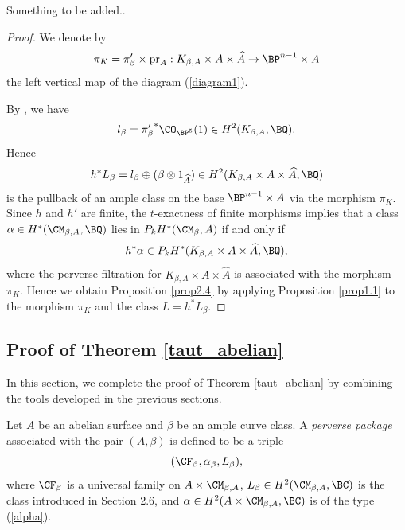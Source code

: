 Something to be added..









\begin{proof}
We denote by
\[
\pi_K = \pi'_\beta \times \mathrm{pr}_A : K_{\beta, A} \times A \times \widehat{A} \to \BP^{n-1}\times A
\]
the left vertical map of the diagram (\ref{diagram1}).

By \cite[Example 3.1]{Markman4}, we have
\[
l_\beta = {\pi'_\beta}^\ast \CO_{\BP^5}(1) \in H^2(K_{\beta,A}, \BQ).
\]
Hence
\[
h^*L_\beta = l_\beta \oplus (\beta\otimes 1_{\widehat{A}}) \in H^2(K_{\beta, A} \times A \times \widehat{A},\BQ)
\]
is the pullback of an ample class on the base $\BP^{n-1}\times A$ via the morphism $\pi_K$. Since $h$ and $h'$ are finite, the $t$-exactness of finite morphisms implies that a class $\alpha \in H^*(\CM_{\beta, A}, \BQ)$ lies in $P_kH^*(\CM_{\beta}, A)$ if and only if
\[
h^* \alpha \in P_kH^*(K_{\beta, A} \times A \times \widehat{A},\BQ),
\]
where the perverse filtration for $K_{\beta, A} \times A \times \widehat{A}$ is associated with the morphism $\pi_K$. Hence we obtain Proposition \ref{prop2.4} by applying Proposition \ref{prop1.1} to the morphism $\pi_K$ and the class $L = h^*L_\beta$.
\end{proof}

\subsection{Proof of Theorem \ref{taut_abelian}}
In this section, we complete the proof of Theorem \ref{taut_abelian} by combining the tools developed in the previous sections.

Let $A$ be an abelian surface and $\beta$ be an ample curve class. A \emph{perverse package} associated with the pair $(A, \beta)$ is defined to be a triple
\[
 (\CF_\beta, \alpha_\beta, L_\beta),
\]
where $\CF_\beta$ is a universal family on $A \times \CM_{\beta,A}$, $L_\beta \in H^2(\CM_{\beta,A}, \BC)$ is the class introduced in Section 2.6, and $\alpha \in H^2(A\times \CM_{\beta,A}, \BC)$ is of the type (\ref{alpha}).

